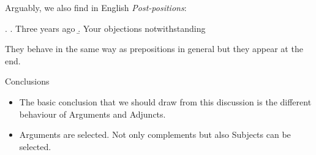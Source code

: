 \begin{frame}
  Arguably, we also find in English \textit{Post-positions}:

\ex.
\a. Three years ago
\b. Your objections notwithstanding


They behave in the same way as prepositions in general but they appear at the end.

\end{frame}



\begin{frame}
  {Conclusions}

\begin{itemize}
\item The basic conclusion that we should draw from this discussion is the different behaviour of Arguments and Adjuncts.  
\item Arguments are selected.  Not only complements but also Subjects can be selected.
\end{itemize}
  
\end{frame}

